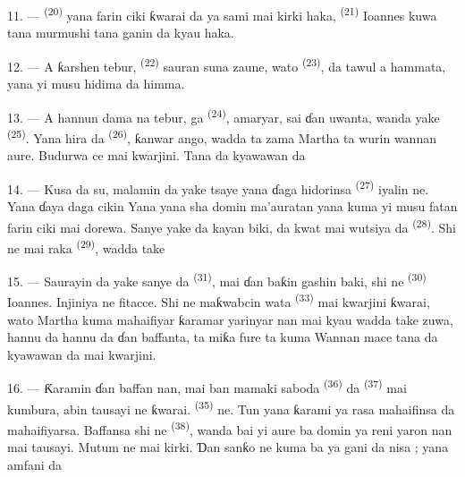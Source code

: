 11. ---  \textsuperscript{(20)} yana farin ciki
ƙwarai da ya sami  mai kirki haka, 
\textsuperscript{(21)} Ioannes kuwa tana murmushi tana ganin
 da kyau haka.

12. --- A ƙarshen tebur,  \textsuperscript{(22)} sauran
suna zaune, wato 
 \textsuperscript{(23)}, da tawul a
hammata, yana yi musu hidima da himma.

\VUsaut{3.0mm}

13. --- A hannun dama na tebur, ga 
\textsuperscript{(24)},  amaryar, sai ɗan uwanta,
wanda yake  \textsuperscript{(25)}. Yana
hira da  \textsuperscript{(26)}, ƙanwar
ango, wadda ta zama  Martha ta wurin wannan aure.
Budurwa ce mai kwarjini. Tana da kyawawan 
 da 

14. --- Kusa da su, malamin da yake tsaye yana ɗaga hidorinsa
 \textsuperscript{(27)} iyalin ne. Yana ɗaya daga cikin
 Yana  yana sha domin
 ma’auratan yana kuma yi musu fatan farin ciki mai
dorewa. Sanye yake da kayan biki, da kwat mai wutsiya da
 \textsuperscript{(28)}. Shi ne mai raka
 \textsuperscript{(29)}, wadda take 

15. --- Saurayin da yake sanye da 
\textsuperscript{(31)}, mai ɗan baƙin gashin baki, shi ne
 \textsuperscript{(30)} Ioannes. Injiniya ne fitacce.
Shi ne maƙwabcin wata  \textsuperscript{(33)}
mai kwarjini ƙwarai, wato  Martha kuma mahaifiyar
ƙaramar yarinyar nan mai kyau wadda take zuwa, hannu da hannu da ɗan
baffanta, ta miƙa fure ta kuma  Wannan mace tana da kyawawan  da
 mai kwarjini.

16. --- Ƙaramin ɗan baffan nan, mai ban mamaki saboda  \textsuperscript{(36)} da 
\textsuperscript{(37)} mai kumbura, abin tausayi ne ƙwarai.
 \textsuperscript{(35)} ne. Tun yana ƙarami ya rasa
mahaifinsa da mahaifiyarsa. Baffansa shi ne 
\textsuperscript{(38)}, wanda bai yi aure ba domin ya reni yaron nan
mai tausayi. Mutum ne mai kirki. Ɗan sanƙo ne kuma ba ya gani da
nisa ; yana amfani da 

